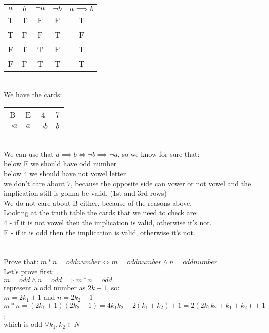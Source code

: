 \documentclass{article}
\begin{document}
\begin{tabular}{ c c c c c }
  $a$ & $b$ & $\neg a$ & $ \neg b$ & $a \implies b$ \\
  T   & T   & F        & F         & T              \\
  T   & F   & F        & T         & F              \\
  F   & T   & T        & F         & T              \\
  F   & F   & T        & T         & T              \\
\end{tabular} \\
We have the cards: \\
\begin{tabular}{ c c c c  }
  B        & E   & 4        & 7   \\
  $\neg a$ & $a$ & $\neg b$ & $b$ \\
\end{tabular} \\

We can use that $a \implies b \Leftrightarrow \neg b \implies \neg a$, so we know for sure that:\\
below E we should have odd number\\
below 4 we should have not vowel letter\\
we don't care about 7, because the opposite side can vower or not vowel and the implication still is gonna be valid. (1st and 3rd rows) \\
We do not care about B either, because of the reasons above.\\

Looking at the truth table the cards that we need to check are: \\
4 - if it is not vowel then the implication is valid, otherwise it's not. \\
E - if it is odd then the implication is valid, otherwise it's not.

\section{}
Prove that: $m*n = odd number \Leftrightarrow m = odd number \wedge n = odd number$ \\
Let's prove first: \\
$m = odd  \wedge n = odd \implies m*n = odd$ \\
represent a odd number as $2k + 1$, so:\\
$m = 2k_1 + 1$ and $n = 2k_2 + 1$\\
$m*n = (2k_1 + 1)(2k_2+1) = 4k_1k_2 + 2(k_1 + k_2) + 1 = 2(2k_1k_2 + k_1 + k_2) + 1$,\\
which is odd $\forall k_1,k_2 \in N$\\
\end{document}
